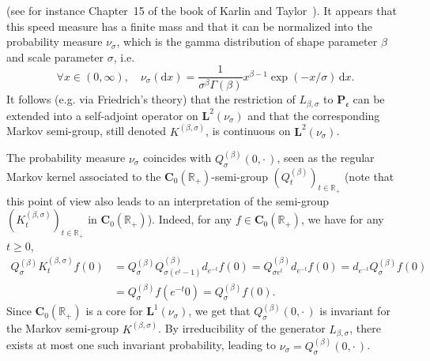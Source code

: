 \documentclass[AHL,Unicode,longabstracts]{cedram}
\newcommand{\RR}{\mathbb{R}}
\newcommand{\fe}{\mathfrak{e}}
\newcommand{\iy}{\infty}
\newcommand{\esP}{\mathbf{P}}
\newcommand{\esL}{\mathbf{L}}
\newcommand{\esC}{\mathbf{C}}
\newcommand{\esPe}{\esP_{\! \fe}}
\let\oldforall\forall
\renewcommand*{\forall}{\mathrel{\oldforall}}
\newcommand*{\dd}{\mathrm{d}}
\newcommand*{\dx}{\dd x}
\begin{document}
(see for instance Chapter~15 of the book of Karlin and Taylor~\cite{MR611513}). It appears that this speed measure has a finite mass and that it can be normalized into the probability measure $\nu_{\sigma}$, which is the gamma distribution of shape parameter $\beta$ and scale parameter $\sigma$, i.e.
\[
\forall x\in(0,\iy),\quad \nu_{\sigma}(\dx)= \frac{1}{\sigma^{\beta}\Gamma(\beta)}x^{\beta-1}\exp(-x/\sigma)\, \dx.
\]
It follows (e.g. via Friedrich's theory) that the restriction of $L_{\beta,\sigma}$ to $\esPe$ can be extended into a self-adjoint operator on $\esL^2(\nu_{\sigma})$ and that the corresponding Markov semi-group, still denoted $K^{(\beta,\sigma)}$, is continuous on $\esL^2(\nu_{\sigma})$.

\begin{rema}\label{Q0dot}
The probability measure $\nu_{\sigma}$ coincides with $Q^{(\beta)}_{\sigma}(0,{\cdot\,})$, seen as the regular Markov kernel associated to the $\esC_0(\RR_+)$-semi-group $(Q^{(\beta)}_t)_{t\in\RR_+}$ (note that this point of view also leads to an interpretation of the semi-group $(K^{(\beta,\sigma)}_t)_{t\in\RR_+}$ in $\esC_0(\RR_+)$). Indeed, for any $f\in\esC_0(\RR_+)$, we have for any $t\geq 0$,
\begin{align*}
Q^{(\beta)}_\sigma K_t^{(\beta,\sigma)}f(0)&=Q^{(\beta)}_\sigma Q^{(\beta)}_{\sigma(e^{t}-1)}d_{e^{-t}} f(0) =Q^{(\beta)}_{\sigma e^{t}}d_{e^{-t}}f(0) =d_{e^{-t}}Q^{(\beta)}_\sigma f(0)\\
&=Q^{(\beta)}_\sigma f(e^{-t}0)=Q^{(\beta)}_\sigma f (0).
\end{align*}
Since $\esC_0(\RR_+)$ is a core for $\esL^1(\nu_{\sigma})$, we get that $Q^{(\beta)}_{\sigma}(0,{\cdot\,})$ is invariant for the Markov semi-group $K^{(\beta,\sigma)}$. By irreducibility of the generator $L_{\beta,\sigma}$, there exists at most one such invariant probability, leading to $\nu_{\sigma}=Q^{(\beta)}_{\sigma}(0,{\cdot\,})$.



\end{rema}
\end{document}
